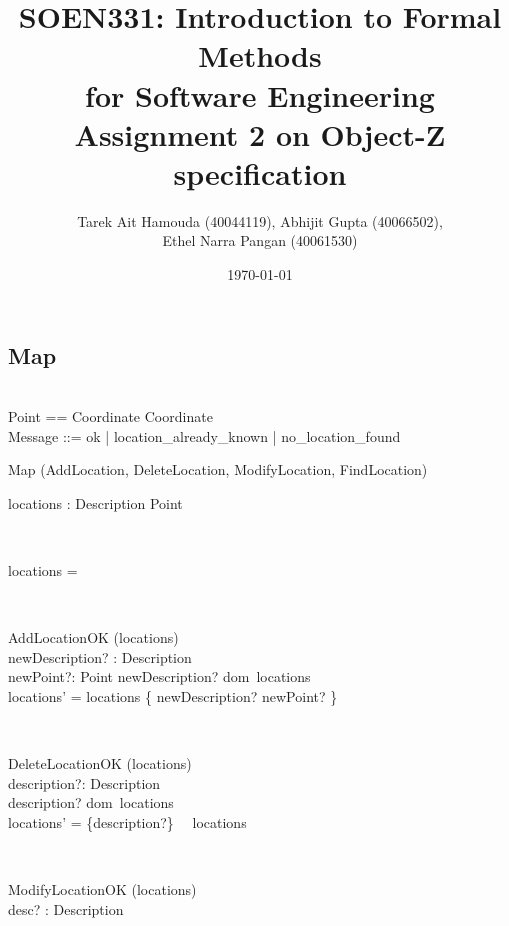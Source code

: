 \documentclass[12pt]{article}
\title{SOEN331: Introduction to Formal Methods\\for Software Engineering\\
Assignment 2 on Object-Z specification}
\author{Tarek Ait Hamouda (40044119), Abhijit Gupta (40066502),\\ 
Ethel Narra Pangan (40061530)}
\date{\today}
\begin{document}
\begin{spacing}{1.5}

\maketitle

\newpage

\section{Map}
\begin{zed}
 \\
Point == Coordinate \times Coordinate \\
Message ::= ok | location\_already\_known | no\_location\_found \\ 
\end{zed}
\begin{class}{Map}
\upharpoonright (AddLocation, DeleteLocation, ModifyLocation, FindLocation) \\
\begin{state}
locations : Description \pfun Point\\
\end{state} \\
\begin{init}
locations = \emptyset
\end{init} \\
\begin{op}{AddLocationOK}
\Delta (locations) \\
newDescription? : Description\\
newPoint?: Point 
\ST
newDescription? \notin dom~locations \\
locations' = locations \cup \{ newDescription? \to newPoint? \}
\end{op}\\
\begin{op}{DeleteLocationOK}
\Delta (locations) \\
description?: Description\\
\ST
description? \in dom~locations\\
locations' = \{description?\}~ \ooalign{$\triangleleft$\cr\hidewidth\scalebox{.65}[1]{$-$}\hidewidth\cr} ~locations
\end{op}\\
\begin{op}{ModifyLocationOK}
\Delta (locations) \\
desc? : Description\\

\end{op}
\end{class}
\end{spacing}
\end{document}

